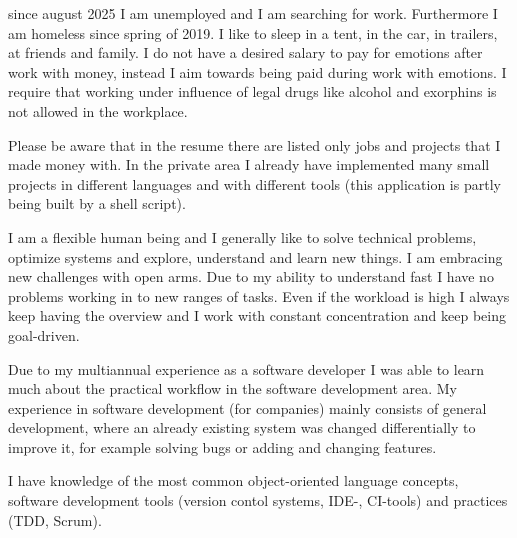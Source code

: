 \documentclass[fromphone,parskip=half]{scrlttr2}%
\newcommand\versionLanguageStart{}
\newcommand\versionLanguageEnd{}
\begin{document}
	\begin{letter}%
	{
		\addressReceiver
	}
		\opening{\joinList{\dear}{\genderReceiver}{\surnameReceiver}{,}}
\versionLanguageStart%
		since august 2025 I am unemployed and I am searching for work.
		Furthermore I am homeless since spring of 2019.
		I like to sleep in a tent, in the car, in trailers, at friends and family.
		I do not have a desired salary to pay for emotions after work with money, instead I aim towards being paid during work with emotions.
		I require that working under influence of legal drugs like alcohol and exorphins is not allowed in the workplace.
\versionLanguageEnd
		
		
\versionLanguageStart%
		Please be aware that in the resume there are listed only jobs and projects that I made money with.
		In the private area I already have implemented many small projects in different languages and with different tools (this application is partly being built by a shell script).
\versionLanguageEnd

\versionLanguageStart%
		I am a flexible human being and I generally like to solve technical problems, optimize systems and explore, understand and learn new things.
		I am embracing new challenges with open arms.
		Due to my ability to understand fast I have no problems working in to new ranges of tasks.
		Even if the workload is high I always keep having the overview and I work with constant concentration and keep being goal-driven.
\versionLanguageEnd
		
\versionLanguageStart%
		Due to my multiannual experience as a software developer I was able to learn much about the practical workflow in the software development area.
		My experience in software development (for companies) mainly consists of general development, where an already existing system was changed differentially to improve it, for example solving bugs or adding and changing features.
\versionLanguageEnd

\versionLanguageStart%
		I have knowledge of the most common object-oriented language concepts, software development tools (version contol systems, IDE-, CI-tools) and practices (TDD, Scrum).
\versionLanguageEnd


\end{letter}
\end{document}
